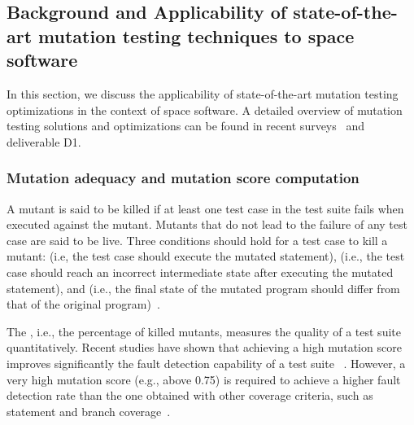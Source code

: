 
\subsection{Background and Applicability of state-of-the-art mutation testing techniques to space software}
\label{sec:background}

In this section, we discuss the applicability of state-of-the-art mutation testing optimizations in the context of space software. A detailed overview of mutation testing solutions and optimizations can be found in recent surveys~\cite{jia2010analysis,papadakis2019mutation} and deliverable D1.

\subsubsection{Mutation adequacy and mutation score computation}
\label{background:adequacy}
A mutant is said to be killed if at least one test case in the test suite fails when executed against the mutant.
Mutants that do not lead to the failure of any test case are said to be live.
Three conditions should hold for a test case to kill a mutant:  (i.e, the test case should execute the mutated statement),  (i.e., the test case should reach an incorrect intermediate state after executing the mutated statement), and  (i.e., the final state of the mutated program should differ from that of the original program)~\cite{offutt1997automatically}.

The , i.e., the percentage of killed mutants, measures the quality of a test suite quantitatively. Recent studies have shown that achieving a high mutation score improves significantly the fault detection capability of a test suite
~\cite{papadakis2018mutation}. 
However, a very high mutation score (e.g., above 0.75) is required to achieve a higher fault detection rate than the one obtained with other coverage criteria, such as statement and branch coverage~\cite{Chekam:17}.


